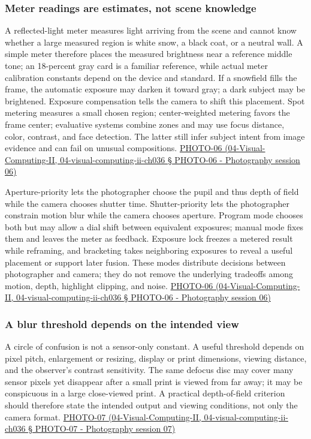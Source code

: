 \subsubsection{Meter readings are estimates, not scene knowledge}\label{meter-readings-are-estimates-not-scene-knowledge}

A reflected-light meter measures light arriving from the scene and cannot know whether a large measured region is white snow, a black coat, or a neutral wall. A simple meter therefore places the measured brightness near a reference middle tone; an 18-percent gray card is a familiar reference, while actual meter calibration constants depend on the device and standard. If a snowfield fills the frame, the automatic exposure may darken it toward gray; a dark subject may be brightened. Exposure compensation tells the camera to shift this placement. Spot metering measures a small chosen region; center-weighted metering favors the frame center; evaluative systems combine zones and may use focus distance, color, contrast, and face detection. The latter still infer subject intent from image evidence and can fail on unusual compositions. \href{}{PHOTO-06 (04-Visual-Computing-II, 04-visual-computing-ii-ch036 § PHOTO-06 - Photography session 06)}

Aperture-priority lets the photographer choose the pupil and thus depth of field while the camera chooses shutter time. Shutter-priority lets the photographer constrain motion blur while the camera chooses aperture. Program mode chooses both but may allow a dial shift between equivalent exposures; manual mode fixes them and leaves the meter as feedback. Exposure lock freezes a metered result while reframing, and bracketing takes neighboring exposures to reveal a useful placement or support later fusion. These modes distribute decisions between photographer and camera; they do not remove the underlying tradeoffs among motion, depth, highlight clipping, and noise. \href{}{PHOTO-06 (04-Visual-Computing-II, 04-visual-computing-ii-ch036 § PHOTO-06 - Photography session 06)}

\subsubsection{A blur threshold depends on the intended view}\label{a-blur-threshold-depends-on-the-intended-view}

A circle of confusion is not a sensor-only constant. A useful threshold depends on pixel pitch, enlargement or resizing, display or print dimensions, viewing distance, and the observer's contrast sensitivity. The same defocus disc may cover many sensor pixels yet disappear after a small print is viewed from far away; it may be conspicuous in a large close-viewed print. A practical depth-of-field criterion should therefore state the intended output and viewing conditions, not only the camera format. \href{}{PHOTO-07 (04-Visual-Computing-II, 04-visual-computing-ii-ch036 § PHOTO-07 - Photography session 07)}


